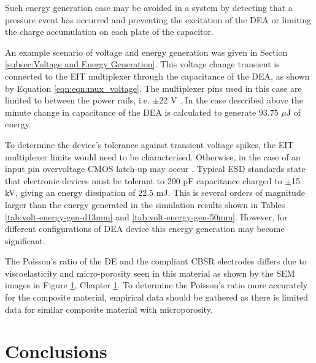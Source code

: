 Such energy generation case may be avoided in a system by detecting that a pressure event has occurred and preventing the excitation of the DEA or limiting the charge accumulation on each plate of the capacitor.

An example scenario of voltage and energy generation was given in Section \ref{subsec:Voltage and Energy Generation}. This voltage change transient is connected to the EIT multiplexer through the capacitance of the DEA, as shown by Equation \ref{eqn:eqn:mux_voltage}. The multiplexer pins used in this case are limited to between the power rails, i.e. $\pm$22 V \cite{VishayPG2018}. In the case described above the minute change in capacitance of the DEA is calculated to generate 93.75 $\mu$J of energy.

To determine the device's tolerance against transient voltage spikes, the EIT multiplexer limits would need to be characterised. Otherwise, in the case of an input pin overvoltage CMOS latch-up may occur \cite{Redmond2001} . Typical ESD standards \cite{IEC2008} state that electronic devices must be tolerant to 200 pF capacitance charged to $\pm$15 kV, giving an energy dissipation of 22.5 mJ. This is several orders of magnitude larger than the energy generated in the simulation results shown in Tables \ref{tab:volt-energy-gen-d13mm} and \ref{tab:volt-energy-gen-50mm}. However, for different configurations of DEA device this energy generation may become significant.

The Poisson's ratio of the DE and the compliant CBSR electrodes differs due to viscoelasticity and micro-porosity seen in this material as shown by the SEM images in Figure \ref{}, Chapter \ref{}. To determine the Poisson's ratio more accurately for the composite material, empirical data should be gathered as there is limited data for similar composite material with microporosity.  %


\section{Conclusions}

